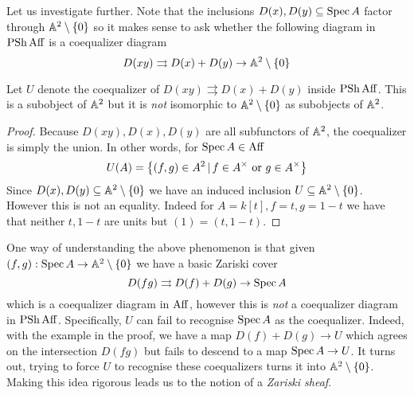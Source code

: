 \documentclass[./main.tex]{subfiles}
\begin{document}
Let us investigate further.
Note that the inclusions $D(x) , D(y) \subseteq \operatorname{Spec} A$
factor through $\mathbb{A}^2\setminus\left\{0\right\}$
so it makes sense to ask whether the following diagram
in $\operatorname{PSh} \mathrm{Aff}$ is a coequalizer diagram
\[
  D(x y) \rightrightarrows D(x) + D(y) \to \mathbb{A}^2 \setminus \left\{0\right\}
\]
\begin{prop}
  
  Let $U$ denote the coequalizer of $D(x y) \rightrightarrows D(x) + D(y)$
  inside $\operatorname{PSh} \mathrm{Aff}$.
  This is a subobject of $\mathbb{A}^2$ but it is \emph{not}
  isomorphic to $\mathbb{A}^2\setminus\left\{0\right\}$ as subobjects of $\mathbb{A}^2$.
\end{prop}
\begin{proof}
  Because $D(xy) , D(x) , D(y)$ are all subfunctors of $\mathbb{A}^2$,
  the coequalizer is simply the union.
  In other words, for $\operatorname{Spec} A \in \mathrm{Aff}$ 
  \[
    U(A) = \left\{(f , g) \in A^2 \,|\, f \in A^\times \text{ or } g \in A^\times\right\}
  \]
  Since $D(x) , D(y) \subseteq \mathbb{A}^2\setminus\left\{0\right\}$
  we have an induced inclusion $U \subseteq \mathbb{A}^2\setminus\left\{0\right\}$.
  However this is not an equality.
  Indeed for $A = k[t] , f = t , g = 1 - t$
  we have that neither $t , 1 - t$ are units but
  $(1) = (t , 1 - t)$.
\end{proof}
One way of understanding the above phenomenon is that
given $(f , g) : \operatorname{Spec} A \to \mathbb{A}^2\setminus\left\{0\right\}$ we have 
a basic Zariski cover
\[
  D(f g) \rightrightarrows D(f) + D(g) \to \operatorname{Spec} A  
\]
which is a coequalizer diagram in $\mathrm{Aff}$,
however this is \emph{not} a coequalizer diagram in $\operatorname{PSh} \mathrm{Aff}$.
Specifically, $U$ can fail to recognise $\operatorname{Spec} A$ as the coequalizer.
Indeed, with the example in the proof,
we have a map $D(f) + D(g) \to U$ which agrees on the
intersection $D(fg)$ but fails to descend 
to a map $\operatorname{Spec} A \to U$.
It turns out,
trying to force $U$ to recognise these coequalizers 
turns it into $\mathbb{A}^2\setminus\left\{0\right\}$.
Making this idea rigorous leads us to the notion of a \emph{Zariski sheaf}.
  
\end{document}
